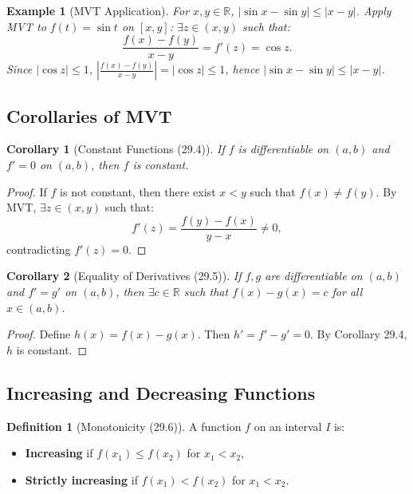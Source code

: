 \documentclass[9pt]{article}
\theoremstyle{definition}
\newtheorem{definition}{Definition}
\theoremstyle{plain}
\newtheorem{example}{Example}
\newtheorem{corollary}{Corollary}
\begin{document}
\begin{example}[MVT Application]
For \( x, y \in \mathbb{R} \), \( |\sin x - \sin y| \leq |x - y| \). Apply MVT to \( f(t) = \sin t \) on \( [x, y] \): \( \exists z \in (x, y) \) such that:
\[
\frac{f(x) - f(y)}{x - y} = f'(z) = \cos z.
\]
Since \( |\cos z| \leq 1 \), \( \left| \frac{f(x) - f(y)}{x - y} \right| = |\cos z| \leq 1 \), hence \( |\sin x - \sin y| \leq |x - y| \).
\end{example}

\subsection*{Corollaries of MVT}
\begin{corollary}[Constant Functions (29.4)]
If \( f \) is differentiable on \( (a, b) \) and \( f' = 0 \) on \( (a, b) \), then \( f \) is constant.
\end{corollary}

\begin{proof}
If \( f \) is not constant, then there exist \( x < y \) such that \( f(x) \neq f(y) \). By MVT, \( \exists z \in (x, y) \) such that:
\[
f'(z) = \frac{f(y) - f(x)}{y - x} \neq 0,
\]
contradicting \( f'(z) = 0 \).
\end{proof}

\begin{corollary}[Equality of Derivatives (29.5)]
If \( f, g \) are differentiable on \( (a, b) \) and \( f' = g' \) on \( (a, b) \), then \( \exists c \in \mathbb{R} \) such that \( f(x) - g(x) = c \) for all \( x \in (a, b) \).
\end{corollary}

\begin{proof}
Define \( h(x) = f(x) - g(x) \). Then \( h' = f' - g' = 0 \). By Corollary 29.4, \( h \) is constant.
\end{proof}

\subsection*{Increasing and Decreasing Functions}
\begin{definition}[Monotonicity (29.6)]
A function \( f \) on an interval \( I \) is:
\begin{itemize}
    \item \textbf{Increasing} if \( f(x_1) \leq f(x_2) \) for \( x_1 < x_2 \),
    \item \textbf{Strictly increasing} if \( f(x_1) < f(x_2) \) for \( x_1 < x_2 \).
\end{itemize}
\end{definition}
\end{document}
